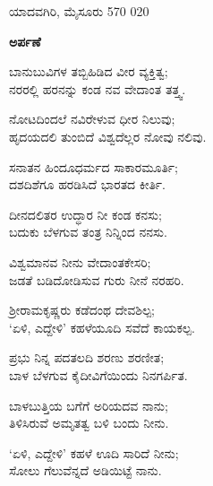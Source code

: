 \noindent ಯಾದವಗಿರಿ, ಮೈಸೂರು 570 020

\newpage\thispagestyle{empty}


\begin{center}
{\LARGE \textbf{ಅರ್ಪಣೆ}}
\end{center}

\begin{center}
ಬಾನುಬುವಿಗಳ ತಬ್ಬಿಹಿಡಿದ ವೀರ ವ್ಯಕ್ತಿತ್ವ;\\ನರರಲ್ಲಿ ಹರನನ್ನು ಕಂಡ ನವ ವೇದಾಂತ ತತ್ತ್ವ.
\end{center}

\begin{center}
ನೋಟದಿಂದಲೆ ನವಿರೇಳುವ ಧೀರ ನಿಲುವು;\\ಹೃದಯದಲಿ ತುಂಬಿದೆ ವಿಶ್ವದೆಲ್ಲರ ನೋವು ನಲಿವು.
\end{center}

\begin{center}
ಸನಾತನ ಹಿಂದೂಧರ್ಮದ ಸಾಕಾರಮೂರ್ತಿ;\\ದಶದಿಶೆಗೂ ಹರಡಿಸಿದೆ ಭಾರತದ ಕೀರ್ತಿ.
\end{center}

\begin{center}
ದೀನದಲಿತರ ಉದ್ಧಾರ ನೀ ಕಂಡ ಕನಸು;\\ಬದುಕು ಬೆಳಗುವ ತಂತ್ರ ನಿನ್ನಿಂದ ನನಸು.
\end{center}

\begin{center}
ವಿಶ್ವಮಾನವ ನೀನು ವೇದಾಂತಕೇಸರಿ;\\ಜಡತೆ ಬಡಿದೋಡಿಸುವ ಗುರು ನೀನೆ ನರಹರಿ.
\end{center}

\begin{center}
ಶ‍್ರೀರಾಮಕೃಷ್ಣರು ಕಡೆದಂಥ ದೇವಶಿಲ್ಪ;\\‘ಏಳಿ, ಎದ್ದೇಳಿ’ ಕಹಳೆಯೂದಿ ಸವೆದೆ ಕಾಯಕಲ್ಪ.
\end{center}

\begin{center}
ಪ್ರಭು ನಿನ್ನ ಪದತಲದಿ ಶರಣು ಶರಣೀತ;\\ಬಾಳ ಬೆಳಗುವ ಕೈದೀವಿಗೆಯಿಂದು ನಿನಗರ್ಪಿತ.
\end{center}

\begin{center}
ಬಾಳಬುತ್ತಿಯ ಬಗೆಗೆ ಅರಿಯದವ ನಾನು;\\ತಿಳಿಸಿರುವೆ ಅಮೃತತ್ವ ಬಳಿ ಬಂದು ನೀನು.
\end{center}

\begin{center}
‘ಏಳಿ, ಎದ್ದೇಳಿ’ ಕಹಳೆ ಊದಿ ಸಾರಿದೆ ನೀನು;\\ಸೋಲು ಗೆಲುವೆನ್ನದೆ ಅಡಿಯಿಟ್ಟೆ ನಾನು.
\end{center}

